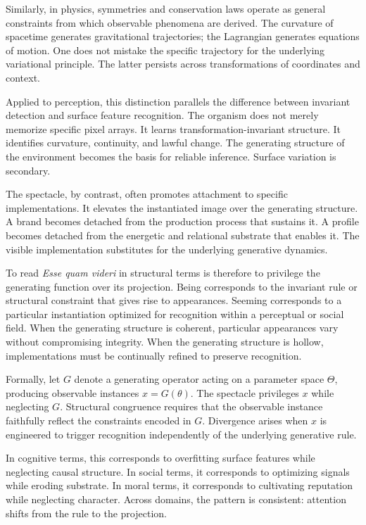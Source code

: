 \documentclass[11pt]{article}
\begin{document}
Similarly, in physics, symmetries and conservation laws operate as general constraints from which observable phenomena are derived. The curvature of spacetime generates gravitational trajectories; the Lagrangian generates equations of motion. One does not mistake the specific trajectory for the underlying variational principle. The latter persists across transformations of coordinates and context.

Applied to perception, this distinction parallels the difference between invariant detection and surface feature recognition. The organism does not merely memorize specific pixel arrays. It learns transformation-invariant structure. It identifies curvature, continuity, and lawful change. The generating structure of the environment becomes the basis for reliable inference. Surface variation is secondary.

The spectacle, by contrast, often promotes attachment to specific implementations. It elevates the instantiated image over the generating structure. A brand becomes detached from the production process that sustains it. A profile becomes detached from the energetic and relational substrate that enables it. The visible implementation substitutes for the underlying generative dynamics.

To read \textit{Esse quam videri} in structural terms is therefore to privilege the generating function over its projection. Being corresponds to the invariant rule or structural constraint that gives rise to appearances. Seeming corresponds to a particular instantiation optimized for recognition within a perceptual or social field. When the generating structure is coherent, particular appearances vary without compromising integrity. When the generating structure is hollow, implementations must be continually refined to preserve recognition.

Formally, let $G$ denote a generating operator acting on a parameter space $\Theta$, producing observable instances $x = G(\theta)$. The spectacle privileges $x$ while neglecting $G$. Structural congruence requires that the observable instance faithfully reflect the constraints encoded in $G$. Divergence arises when $x$ is engineered to trigger recognition independently of the underlying generative rule.

In cognitive terms, this corresponds to overfitting surface features while neglecting causal structure. In social terms, it corresponds to optimizing signals while eroding substrate. In moral terms, it corresponds to cultivating reputation while neglecting character. Across domains, the pattern is consistent: attention shifts from the rule to the projection.
\end{document}
